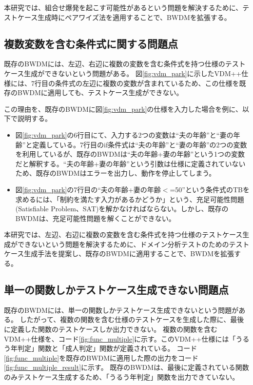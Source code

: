 \documentclass[uplatex, report, a4j, 10pt]{jsbook}
\newcommand{\tool}{BWDM}
\begin{document}
本研究では、組合せ爆発を起こす可能性があるという問題を解決するために、テストケース生成時にペアワイズ法を適用することで、BWDMを拡張する。

\subsection{複数変数を含む条件式に関する問題点}\label{sec:problem_double_var}

既存のBWDMには、左辺、右辺に複数の変数を含む条件式を持つ仕様のテストケース生成ができないという問題がある。
図\ref{fig:vdm_park}に示したVDM++仕様には、7行目の条件式の左辺に複数の変数が含まれているため、この仕様を既存のBWDMに適用しても、テストケース生成ができない。

この理由を、既存のBWDMに図\ref{fig:vdm_park}の仕様を入力した場合を例に、以下で説明する。

\begin{itemize}
  \item 図\ref{fig:vdm_park}の6行目にて、入力する2つの変数は“夫の年齢”と“妻の年齢”と定義している。7行目のif条件式は“夫の年齢”と“妻の年齢”の2つの変数を利用しているが、既存のBWDMは“夫の年齢+妻の年齢”という1つの変数だと解釈する。“夫の年齢+妻の年齢”という引数は仕様に定義されていないため、既存のBWDMはエラーを出力し、動作を停止してしまう。
  \item 図\ref{fig:vdm_park}の7行目の“夫の年齢+妻の年齢$<$=50”という条件式のTBを求めるには、「制約を満たす入力があるかどうか」という、充足可能性問題(Satisfiable Problem、SAT)\cite{sat}を解かなければならない。しかし、既存のBWDMは、充足可能性問題を解くことができない。
\end{itemize}

本研究では、左辺、右辺に複数の変数を含む条件式を持つ仕様のテストケース生成ができないという問題を解決するために、ドメイン分析テストのためのテストケース生成手法を提案し、既存のBWDMに適用することで、BWDMを拡張する。

\subsection{単一の関数しかテストケース生成できない問題点}\label{sec:probrem_only_function}
既存の\tool{}には、単一の関数しかテストケース生成できないという問題がある。
したがって、複数の関数を含む仕様のテストケースを生成した際に、最後に定義した関数のテストケースしか出力できない。
複数の関数を含むVDM++仕様を、コード\ref{fig:func_multiple}に示す。このVDM++仕様には「うるう年判定」関数と「成人判定」関数が定義されている。
コード\ref{fig:func_multiple}を既存のBWDMに適用した際の出力をコード\ref{fig:func_multiple_result}に示す。
既存のBWDMは、最後に定義されている関数のみテストケース生成するため、「うるう年判定」関数を出力できていない。
\end{document}
